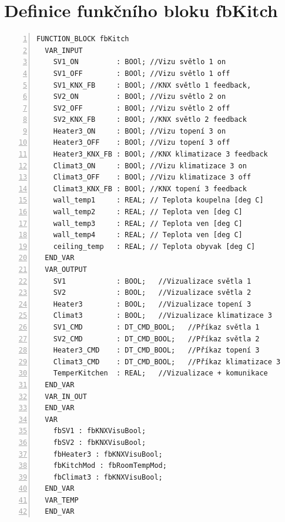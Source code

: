 \chapter{Definice funkčního bloku fbKitch}
\label{apend:fbKitch}
\begin{lstlisting}[language=ST, breaklines=true, numbers=left, numberstyle=\small, numbersep=10pt, frame=single, basicstyle=\ttfamily\small, caption={Definice funkčního bloku fbKitch}, label={lst:fbKitch}]
  FUNCTION_BLOCK fbKitch
  VAR_INPUT
    SV1_ON         : BOOl; //Vizu světlo 1 on
    SV1_OFF        : BOOl; //Vizu světlo 1 off
    SV1_KNX_FB     : BOOl; //KNX světlo 1 feedback,
    SV2_ON         : BOOl; //Vizu světlo 2 on
    SV2_OFF        : BOOl; //Vizu světlo 2 off
    SV2_KNX_FB     : BOOl; //KNX světlo 2 feedback
    Heater3_ON     : BOOl; //Vizu topení 3 on
    Heater3_OFF    : BOOl; //Vizu topení 3 off
    Heater3_KNX_FB : BOOl; //KNX klimatizace 3 feedback
    Climat3_ON     : BOOl; //Vizu klimatizace 3 on
    Climat3_OFF    : BOOl; //Vizu klimatizace 3 off
    Climat3_KNX_FB : BOOl; //KNX topení 3 feedback
    wall_temp1     : REAL; // Teplota koupelna [deg C]
    wall_temp2     : REAL; // Teplota ven [deg C]
    wall_temp3     : REAL; // Teplota ven [deg C]
    wall_temp4     : REAL; // Teplota ven [deg C]
    ceiling_temp   : REAL; // Teplota obyvak [deg C]
  END_VAR
  VAR_OUTPUT
    SV1            : BOOL;   //Vizualizace světla 1
    SV2            : BOOL;   //Vizualizace světla 2
    Heater3        : BOOL;   //Vizualizace topení 3
    Climat3        : BOOL;   //Vizualizace klimatizace 3
    SV1_CMD        : DT_CMD_BOOL;   //Příkaz světla 1
    SV2_CMD        : DT_CMD_BOOL;   //Příkaz světla 2
    Heater3_CMD    : DT_CMD_BOOL;   //Příkaz topení 3
    Climat3_CMD    : DT_CMD_BOOL;   //Příkaz klimatizace 3
    TemperKitchen  : REAL;   //Vizualizace + komunikace
  END_VAR
  VAR_IN_OUT
  END_VAR
  VAR
    fbSV1 : fbKNXVisuBool;
    fbSV2 : fbKNXVisuBool;
    fbHeater3 : fbKNXVisuBool;
    fbKitchMod : fbRoomTempMod;
    fbClimat3 : fbKNXVisuBool;
  END_VAR
  VAR_TEMP
  END_VAR
\end{lstlisting}
